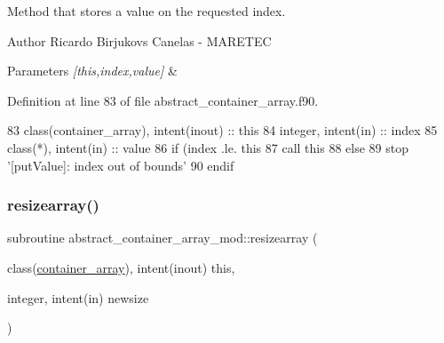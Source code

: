 Method that stores a value on the requested index. 

\begin{DoxyAuthor}{Author}
Ricardo Birjukovs Canelas -\/ M\+A\+R\+E\+T\+EC 
\end{DoxyAuthor}

\begin{DoxyParams}{Parameters}
{\em \mbox{[}this,index,value\mbox{]}} & \\
\hline
\end{DoxyParams}


Definition at line 83 of file abstract\+\_\+container\+\_\+array.\+f90.


\begin{DoxyCode}
83     \textcolor{keywordtype}{class}(container\_array), \textcolor{keywordtype}{intent(inout)} :: this
84     \textcolor{keywordtype}{integer}, \textcolor{keywordtype}{intent(in)} :: index
85     \textcolor{keywordtype}{class}(*), \textcolor{keywordtype}{intent(in)} :: value
86     \textcolor{keywordflow}{if} (index .le. this%
87         \textcolor{keyword}{call }this%
88     \textcolor{keywordflow}{else}
89         stop \textcolor{stringliteral}{'[putValue]: index out of bounds'}
90 \textcolor{keywordflow}{    endif}
\end{DoxyCode}
\mbox{\label{namespaceabstract__container__array__mod_ac2d73eb111ffde938f81e3f93b0cb3e0}} 
\subsubsection{\texorpdfstring{resizearray()}{resizearray()}}
{\footnotesize\ttfamily subroutine abstract\+\_\+container\+\_\+array\+\_\+mod\+::resizearray (\begin{DoxyParamCaption}\item[{class(\mbox{\hyperlink{structabstract__container__array__mod_1_1container__array}{container\+\_\+array}}), intent(inout)}]{this,  }\item[{integer, intent(in)}]{newsize }\end{DoxyParamCaption})\hspace{0.3cm}{\ttfamily [private]}}



